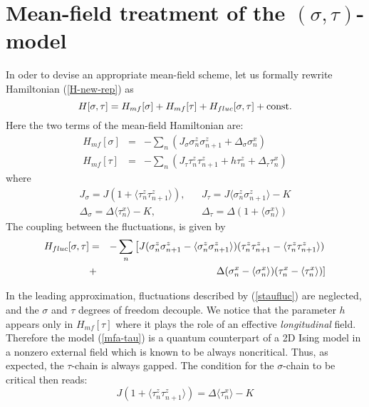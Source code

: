 \newpage
\section{Mean-field treatment of the $(\sigma, \tau)$-model}
\label{meanfield}

In oder to devise an appropriate mean-field scheme,
let us formally rewrite Hamiltonian (\ref{H-new-rep}) as
\begin{equation}
H[\sigma,\tau]=H_{mf}[\sigma] + H_{mf}[\tau] +
H_{fluc}[\sigma,\tau]+{\rm const.}
\label{staubis}
\end{equation}
Here the two terms of the mean-field Hamiltonian are:
\begin{eqnarray}
H_{mf}[\sigma] &=& - \sum_n \left( J_{\sigma} \sigma^z _n \sigma^z _{n+1}
+ \Delta_{\sigma} \sigma^x _n \right)
\label{mfa-sigma}\\
H_{mf}[\tau] &=&- \sum_n \left(J_{\tau} \tau^z _n \tau^z _{n+1}
+ h \tau^z _n + \Delta_{\tau}\tau^x _n \right)
\label{mfa-tau}
\end{eqnarray}
where
\begin{eqnarray}
J_{\sigma} = J \left(1 + \langle \tau^z _n \tau^z _{n+1} \rangle \right), &&
J_{\tau} = J \langle \sigma^z _n \sigma^z _{n+1} \rangle - K \nonumber\\
\Delta_{\sigma} = \Delta \langle \tau^x _n \rangle - K, &&
\Delta_{\tau} = \Delta \left(1 + \langle \sigma^x _n \rangle \right)
\label{parametr.K=0}
\end{eqnarray}
The coupling between the fluctuations,
is given by
\begin{eqnarray}
H_{fluc}[\sigma,\tau]&=&-\sum\limits_n
\left[J (\sigma^z_{n}\sigma^z_{n+1}-\langle\sigma^z_{n}\sigma^z_{n+1}\rangle) (\tau^z_{n}\tau^z_{n+1}-\langle\tau^z_{n}\tau^z_{n+1}\rangle) \right.\nonumber\\&+&\left. \Delta(\sigma^x_{n}-\langle\sigma^x_n\rangle)(\tau^x_{n}-\langle\tau^x_n\rangle) \right]
\label{staufluc}
\end{eqnarray}

In the leading approximation, fluctuations described by (\ref{staufluc})
are neglected, and the $\sigma$ and $\tau$ degrees of freedom decouple.
We notice that the parameter $h$ appears only in $H_{mf}[\tau]$ where
it plays the role of an effective {\sl longitudinal} field. Therefore
the
model (\ref{mfa-tau}) is a quantum counterpart of a 2D Ising model in
a nonzero external field which is known to be always noncritical. Thus,
as expected,
the $\tau$-chain is always gapped.
The condition for the $\sigma$-chain to be critical then reads:
\begin{equation}
J \left(1 + \langle \tau^z _n \tau^z _{n+1} \rangle \right) =
\Delta \langle \tau^x _n \rangle - K
\label{crit-cond}
\end{equation}

